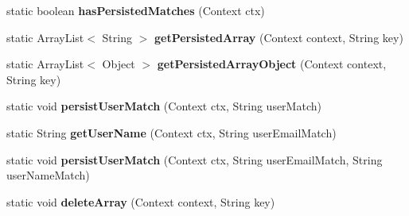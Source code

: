 \begin{DoxyCompactItemize}
\item 
static boolean {\bfseries has\+Persisted\+Matches} (Context ctx)\hypertarget{classcom_1_1example_1_1sebastian_1_1tindertp_1_1commonTools_1_1ArraySerialization_a0df8bc47cbdc075f004ea005d690c82c}{}\label{classcom_1_1example_1_1sebastian_1_1tindertp_1_1commonTools_1_1ArraySerialization_a0df8bc47cbdc075f004ea005d690c82c}

\item 
static Array\+List$<$ String $>$ {\bfseries get\+Persisted\+Array} (Context context, String key)\hypertarget{classcom_1_1example_1_1sebastian_1_1tindertp_1_1commonTools_1_1ArraySerialization_aab5218831832e2dfd0807177e139225d}{}\label{classcom_1_1example_1_1sebastian_1_1tindertp_1_1commonTools_1_1ArraySerialization_aab5218831832e2dfd0807177e139225d}

\item 
static Array\+List$<$ Object $>$ {\bfseries get\+Persisted\+Array\+Object} (Context context, String key)\hypertarget{classcom_1_1example_1_1sebastian_1_1tindertp_1_1commonTools_1_1ArraySerialization_a40211fca8df5f97480d275c5aa9ed812}{}\label{classcom_1_1example_1_1sebastian_1_1tindertp_1_1commonTools_1_1ArraySerialization_a40211fca8df5f97480d275c5aa9ed812}

\item 
static void {\bfseries persist\+User\+Match} (Context ctx, String user\+Match)\hypertarget{classcom_1_1example_1_1sebastian_1_1tindertp_1_1commonTools_1_1ArraySerialization_a59bd32db77f877b42d4d0fe14dc4c5c0}{}\label{classcom_1_1example_1_1sebastian_1_1tindertp_1_1commonTools_1_1ArraySerialization_a59bd32db77f877b42d4d0fe14dc4c5c0}

\item 
static String {\bfseries get\+User\+Name} (Context ctx, String user\+Email\+Match)\hypertarget{classcom_1_1example_1_1sebastian_1_1tindertp_1_1commonTools_1_1ArraySerialization_aa7ae212523ee85ff8e3c1ab9ab2baf84}{}\label{classcom_1_1example_1_1sebastian_1_1tindertp_1_1commonTools_1_1ArraySerialization_aa7ae212523ee85ff8e3c1ab9ab2baf84}

\item 
static void {\bfseries persist\+User\+Match} (Context ctx, String user\+Email\+Match, String user\+Name\+Match)\hypertarget{classcom_1_1example_1_1sebastian_1_1tindertp_1_1commonTools_1_1ArraySerialization_a74148a23761f8cd487aa6d48370e030d}{}\label{classcom_1_1example_1_1sebastian_1_1tindertp_1_1commonTools_1_1ArraySerialization_a74148a23761f8cd487aa6d48370e030d}

\item 
static void {\bfseries delete\+Array} (Context context, String key)\hypertarget{classcom_1_1example_1_1sebastian_1_1tindertp_1_1commonTools_1_1ArraySerialization_aff839eb0d3fe622910d039c563634185}{}\label{classcom_1_1example_1_1sebastian_1_1tindertp_1_1commonTools_1_1ArraySerialization_aff839eb0d3fe622910d039c563634185}

\end{DoxyCompactItemize}
